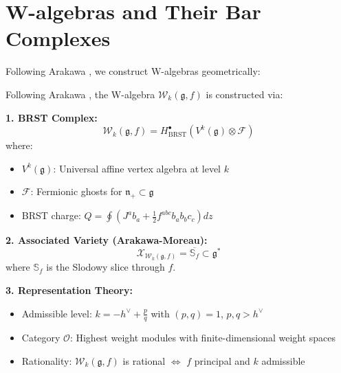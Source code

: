 \section{W-algebras and Their Bar Complexes}

Following Arakawa \cite{Arakawa-lectures}, we construct W-algebras geometrically:

\begin{theorem}\label{thm:w-algebras}
Following Arakawa \cite{Arakawa-lectures}, the W-algebra $\mathcal{W}_k(\mathfrak{g}, f)$ is constructed via:

\textbf{1. BRST Complex:}
$$\mathcal{W}_k(\mathfrak{g}, f) = H^{\bullet}_{\text{BRST}}(V^k(\mathfrak{g}) \otimes \mathcal{F})$$
where:
\begin{itemize}
\item $V^k(\mathfrak{g})$: Universal affine vertex algebra at level $k$
\item $\mathcal{F}$: Fermionic ghosts for $\mathfrak{n}_+ \subset \mathfrak{g}$
\item BRST charge: $Q = \oint (J^a b_a + \frac{1}{2}f^{abc}b_a b_b c_c) dz$
\end{itemize}

\textbf{2. Associated Variety (Arakawa-Moreau):}
$$\mathcal{X}_{\mathcal{W}_k(\mathfrak{g}, f)} = \overline{\mathbb{S}_f} \subset \mathfrak{g}^*$$
where $\mathbb{S}_f$ is the Slodowy slice through $f$.

\textbf{3. Representation Theory:}
\begin{itemize}
\item Admissible level: $k = -h^{\vee} + \frac{p}{q}$ with $(p,q) = 1$, $p,q > h^{\vee}$
\item Category $\mathcal{O}$: Highest weight modules with finite-dimensional weight spaces
\item Rationality: $\mathcal{W}_k(\mathfrak{g}, f)$ is rational $\Leftrightarrow$ $f$ principal and $k$ admissible
\end{itemize}
\end{theorem}

